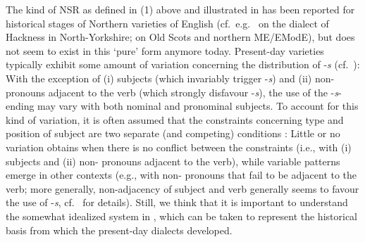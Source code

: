 \documentclass[output=paper]{langsci/langscibook}
\begin{document}
The kind of \gls{NSR} as defined in (1) above and illustrated in
 has been reported for historical stages of Northern varieties
of English (cf.\ e.g.\ \citealt{Cowling:1915} on the dialect of Hackness in
North-Yorkshire; \citealt{Montgomery:1994} on Old Scots and northern ME/EModE), but does
not seem to exist in this `pure' form anymore today. Present-day varieties
typically exhibit some amount of variation concerning the distribution of
-\emph{s} (cf.\ \citealt{Montgomery:1994,Britain:2002,Pietsch:2005a,Pietsch:2005b,AdgerSmith2010,Buchstaller_etal:2013,Childs:2013}): With the exception of (i) \Tsg{} subjects (which
    invariably trigger -\emph{s}) and (ii) non-\Tsg{} pronouns adjacent to the
    verb (which strongly disfavour -\emph{s}), the use of the -\emph{s}-ending
    may vary with both nominal and pronominal subjects. To account for this
    kind of variation, it is often assumed that the constraints concerning type
    and position of subject are two separate (and competing) conditions
    \parencite{Montgomery:1994,Pietsch:2005a,Pietsch:2005b}: Little or no
    variation obtains when there is no conflict between the constraints (i.e.,
    with (i) \Tsg{} subjects and (ii) non-\Tsg{} pronouns adjacent to the
    verb), while variable  patterns emerge in other contexts
    (e.g., with non-\Tsg{} pronouns that fail to be adjacent to the verb; more
    generally, non-adjacency of subject and verb generally seems to favour the
    use of -\emph{s}, cf.\ \citealt{Pietsch:2005b} for details). Still, we think that it
    is important to understand the somewhat idealized system in
    , which can be taken to represent the historical basis
    from which the present-day dialects developed.
\end{document}
